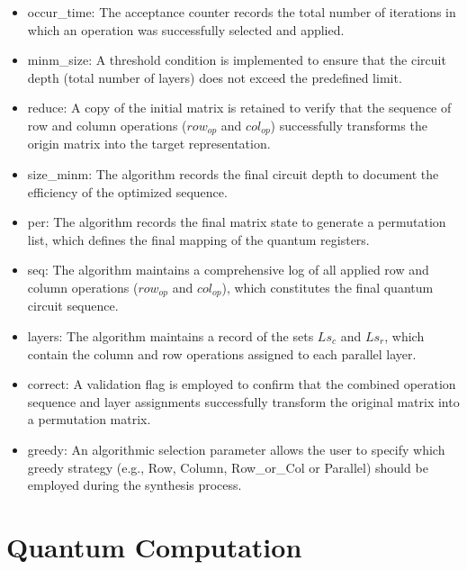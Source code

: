 \begin{itemize}
    \item occur\_time: The acceptance counter records the total number of iterations in which an operation was successfully selected and applied.
    \item minm\_size: A threshold condition is implemented to ensure that the circuit depth (total number of layers) does not exceed the predefined limit.
    \item reduce: A copy of the initial matrix is retained to verify that the sequence of row and column operations ($row_{op}$ and $col_{op}$) successfully transforms the origin matrix into the target representation.
    \item size\_minm: The algorithm records the final circuit depth to document the efficiency of the optimized sequence.
    \item per: The algorithm records the final matrix state to generate a permutation list, which defines the final mapping of the quantum registers.
    \item seq: The algorithm maintains a comprehensive log of all applied row and column operations ($row_{op}$ and $col_{op}$), which constitutes the final quantum circuit sequence.
    \item layers: The algorithm maintains a record of the sets $Ls_{c}$ and $Ls_{r}$, which contain the column and row operations assigned to each parallel layer.
    \item correct: A validation flag is employed to confirm that the combined operation sequence and layer assignments successfully transform the original matrix into a permutation matrix.
    \item greedy: An algorithmic selection parameter allows the user to specify which greedy strategy (e.g., Row, Column, Row\_or\_Col or Parallel) should be employed during the synthesis process.
\end{itemize}

\section{Quantum Computation}

